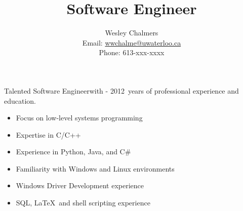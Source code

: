 \documentclass{article}
\begin{document}
\def\jobtitle{Software Engineer}
\def\numyearsworking{\number\numexpr \the\year - 2012\relax}
\title{\jobtitle}
\author{Wesley Chalmers \\ Email: \url{wwchalme@uwaterloo.ca} \\ Phone: 613-xxx-xxxx}
\maketitle
\noindent Talented \jobtitle\space with \numyearsworking~years of professional experience and education.
\begin{itemize}
	\item Focus on low-level systems programming
	\item Expertise in C/C++
	\item Experience in Python, Java, and C\#
	\item Familiarity with Windows and Linux environments
	\item Windows Driver Development experience
	\item SQL, \LaTeX\, and shell scripting experience
\end{itemize}
\end{document}
